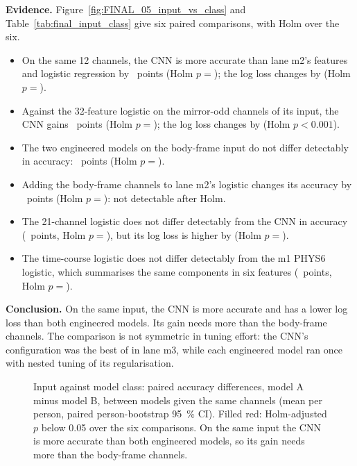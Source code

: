 \textbf{Evidence.}
Figure~\ref{fig:FINAL_05_input_vs_class} and Table~\ref{tab:final_input_class} give six paired comparisons, with Holm over the six.
\begin{itemize}[nosep]
  \item On the same 12 channels, the CNN is more accurate than lane m2's features and logistic regression by ~points (Holm $p = {}$); the log loss changes by  (Holm $p = {}$).
  \item Against the 32-feature logistic on the mirror-odd channels of its input, the CNN gains ~points (Holm $p = {}$); the log loss changes by  (Holm $p < 0.001$).
  \item The two engineered models on the body-frame input do not differ detectably in accuracy: ~points (Holm $p = {}$).
  \item Adding the body-frame channels to lane m2's logistic changes its accuracy by ~points (Holm $p = {}$): not detectable after Holm.
  \item The 21-channel logistic does not differ detectably from the CNN in accuracy (~points, Holm $p = {}$), but its log loss is higher by  (Holm $p = {}$).
  \item The time-course logistic does not differ detectably from the m1 PHYS6 logistic, which summarises the same components in six features (~points, Holm $p = {}$).
\end{itemize}

\textbf{Conclusion.}
On the same input, the CNN is more accurate and has a lower log loss than both engineered models.
Its gain needs more than the body-frame channels.
The comparison is not symmetric in tuning effort: the CNN's configuration was the best of  in lane m3, while each engineered model ran once with nested tuning of its regularisation.

\begin{figure}[htbp]
  \centering
  \caption{Input against model class: paired accuracy differences, model A minus model B, between models given the same channels (mean per person, paired person-bootstrap 95~\% CI).
    Filled red: Holm-adjusted $p$ below 0.05 over the six comparisons.
    On the same input the CNN is more accurate than both engineered models, so its gain needs more than the body-frame channels.}
  \label{fig:FINAL_05_input_vs_class}\label{fig:app:final-input}
\end{figure}

